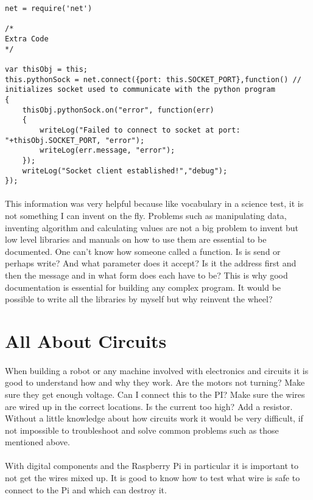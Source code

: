 \documentclass[12pt,a4paper]{report}
\begin{document}
\lstset{language=Java}
\begin{lstlisting}
net = require('net')

/*
Extra Code
*/

var thisObj = this;
this.pythonSock = net.connect({port: this.SOCKET_PORT},function() // initializes socket used to communicate with the python program
{
	thisObj.pythonSock.on("error", function(err)
	{
		writeLog("Failed to connect to socket at port: "+thisObj.SOCKET_PORT, "error");
		writeLog(err.message, "error");
	});
	writeLog("Socket client established!","debug");
});
\end{lstlisting}

\paragraph{}
This information was very helpful because like vocabulary in a science test, it is not something I can invent on the fly. Problems such as manipulating data, inventing algorithm and calculating values are not a big problem to invent but low level libraries and manuals on how to use them are essential to be documented. One can’t know how someone called a function. Is is send or perhaps write? And what parameter does it accept? Is it the address first and then the message and in what form does each have to be?  This is why good documentation is essential for building any complex program. It would be possible to write all the libraries by myself but why reinvent the wheel? 

\section{All About Circuits}

\paragraph{}
When building a robot or any machine involved with electronics and circuits it is good to understand how and why they work. Are the motors not turning? Make sure they get enough voltage. Can I connect this to the PI? Make sure the wires are wired up in the correct locations. Is the current too high? Add a resistor. Without a little knowledge about how circuits work it would be very difficult, if not impossible to troubleshoot and solve common problems such as those mentioned above.

\paragraph{}
With digital components and the Raspberry Pi in particular it is important to not get the wires mixed up. It is good to know how to test what wire is safe to connect to the Pi and which can destroy it.
\end{document}
